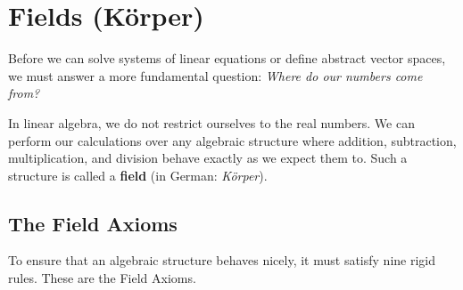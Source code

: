 \setcounter{chapter}{4}
\renewcommand{\thetheorem}{\thechapter.\arabic{section}.\arabic{theorem}}
\setcounter{theorem}{0}

\chapter{Fields (Körper)}

Before we can solve systems of linear equations or define abstract vector spaces, we must answer a more fundamental question: \textit{Where do our numbers come from?} 

In linear algebra, we do not restrict ourselves to the real numbers. We can perform our calculations over any algebraic structure where addition, subtraction, multiplication, and division behave exactly as we expect them to. Such a structure is called a \textbf{field} (in German: \textit{Körper}).

\section{The Field Axioms}

To ensure that an algebraic structure behaves nicely, it must satisfy nine rigid rules. These are the Field Axioms.

